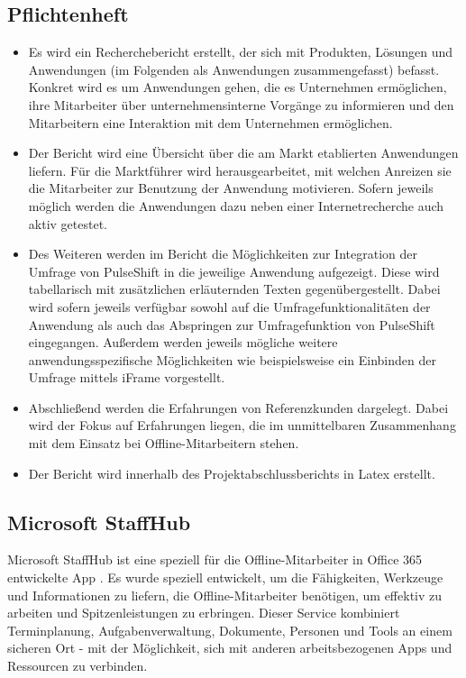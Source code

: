 \subsection{Pflichtenheft}
\begin{itemize}
\item Es wird ein Recherchebericht erstellt, der sich mit Produkten, Lösungen und Anwendungen (im Folgenden als Anwendungen zusammengefasst) befasst. Konkret wird es um Anwendungen gehen, die es Unternehmen ermöglichen, ihre Mitarbeiter über unternehmensinterne Vorgänge zu informieren und den Mitarbeitern eine Interaktion mit dem Unternehmen ermöglichen.
\item Der Bericht wird eine Übersicht über die am Markt etablierten Anwendungen liefern. Für die Marktführer wird herausgearbeitet, mit welchen Anreizen sie die Mitarbeiter zur Benutzung der Anwendung motivieren. Sofern jeweils möglich werden die Anwendungen dazu neben einer Internetrecherche auch aktiv getestet.
\item Des Weiteren werden im Bericht die Möglichkeiten zur Integration der Umfrage von PulseShift in die jeweilige Anwendung aufgezeigt. Diese wird tabellarisch mit zusätzlichen erläuternden Texten gegenübergestellt. Dabei wird sofern jeweils verfügbar sowohl auf die Umfragefunktionalitäten der Anwendung als auch das Abspringen zur Umfragefunktion von PulseShift eingegangen. Außerdem werden jeweils mögliche weitere anwendungsspezifische Möglichkeiten wie beispielsweise ein Einbinden der Umfrage mittels iFrame vorgestellt.
\item Abschließend werden die Erfahrungen von Referenzkunden dargelegt. Dabei wird der Fokus auf Erfahrungen liegen, die im unmittelbaren Zusammenhang mit dem Einsatz bei Offline-Mitarbeitern stehen.
\item Der Bericht wird innerhalb des Projektabschlussberichts in Latex erstellt.
\end{itemize}

\subsection{Microsoft StaffHub}

Microsoft StaffHub ist eine speziell für die Offline-Mitarbeiter in Office 365 entwickelte App . Es wurde speziell entwickelt, um die Fähigkeiten, Werkzeuge und Informationen zu liefern, die Offline-Mitarbeiter benötigen, um effektiv zu arbeiten und Spitzenleistungen zu erbringen. Dieser Service kombiniert Terminplanung, Aufgabenverwaltung, Dokumente, Personen und Tools an einem sicheren Ort - mit der Möglichkeit, sich mit anderen arbeitsbezogenen Apps und Ressourcen zu verbinden.

